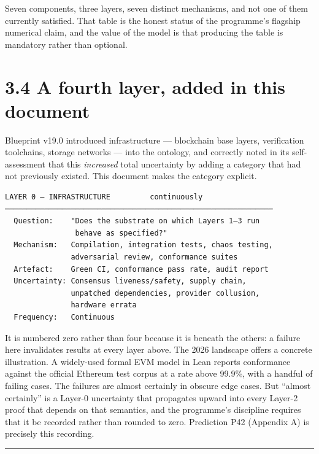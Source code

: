 \documentclass[
  11pt]{report}
\begin{document}
Seven components, three layers, seven distinct mechanisms, and not one
of them currently satisfied. That table is the honest status of the
programme's flagship numerical claim, and the value of the model is that
producing the table is mandatory rather than optional.

\hypertarget{a-fourth-layer-added-in-this-document}{%
\section{3.4 A fourth layer, added in this
document}\label{a-fourth-layer-added-in-this-document}}

Blueprint v19.0 introduced infrastructure --- blockchain base layers,
verification toolchains, storage networks --- into the ontology, and
correctly noted in its self-assessment that this \emph{increased} total
uncertainty by adding a category that had not previously existed. This
document makes the category explicit.

\begin{verbatim}
LAYER 0 — INFRASTRUCTURE         continuously
─────────────────────────────────────────────────────────────
  Question:    "Does the substrate on which Layers 1–3 run
                behave as specified?"
  Mechanism:   Compilation, integration tests, chaos testing,
               adversarial review, conformance suites
  Artefact:    Green CI, conformance pass rate, audit report
  Uncertainty: Consensus liveness/safety, supply chain,
               unpatched dependencies, provider collusion,
               hardware errata
  Frequency:   Continuous
\end{verbatim}

It is numbered zero rather than four because it is beneath the others: a
failure here invalidates results at every layer above. The 2026
landscape offers a concrete illustration. A widely-used formal EVM model
in Lean reports conformance against the official Ethereum test corpus at
a rate above 99.9\%, with a handful of failing cases. The failures are
almost certainly in obscure edge cases. But ``almost certainly'' is a
Layer-0 uncertainty that propagates upward into every Layer-2 proof that
depends on that semantics, and the programme's discipline requires that
it be recorded rather than rounded to zero. Prediction P42 (Appendix A)
is precisely this recording.

\begin{center}\rule{0.5\linewidth}{0.5pt}\end{center}
\end{document}
